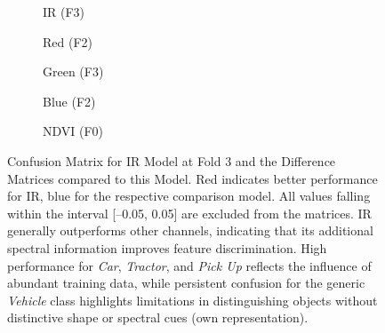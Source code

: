 \begin{figure}[htbp]
    \centering
       
    \begin{subfigure}{0.48\textwidth}
        \centering
        
        \caption{IR (F3)}
        \label{fig:ablation_confM_IR_f0}
    \end{subfigure}

    \begin{subfigure}{0.48\textwidth}
        \centering
        
        \caption{Red (F2)}
        \label{fig:ablation_diffM_r_f2}
    \end{subfigure}
    \begin{subfigure}{0.48\textwidth}
        \centering
        
        \caption{Green (F3)}
        \label{fig:ablation_diffM_g_f3}
    \end{subfigure}
    
    \begin{subfigure}{0.48\textwidth}
        \centering
        
        \caption{Blue (F2)}
        \label{fig:ablation_diffM_b_f2}
    \end{subfigure}
    \begin{subfigure}{0.48\textwidth}
        \centering
        
        \caption{NDVI (F0)}
        \label{fig:ablation_diffM_NDVI_f0}
    \end{subfigure}
    \caption[Confusion Matrix for IR Model at Fold 3 and the Difference Matrices compared to this Model]{Confusion Matrix for IR Model at Fold 3 and the Difference Matrices compared to this Model. Red indicates better performance for IR, blue for the respective comparison model. All values falling within the interval [–0.05, 0.05] are excluded from the matrices. IR generally outperforms other channels, indicating that its additional spectral information improves feature discrimination. High performance for \textit{Car}, \textit{Tractor}, and \textit{Pick Up} reflects the influence of abundant training data, while persistent confusion for the generic \textit{Vehicle} class highlights limitations in distinguishing objects without distinctive shape or spectral cues (own representation).
}
    \label{fig:ablation_diffM_all}
\end{figure}

